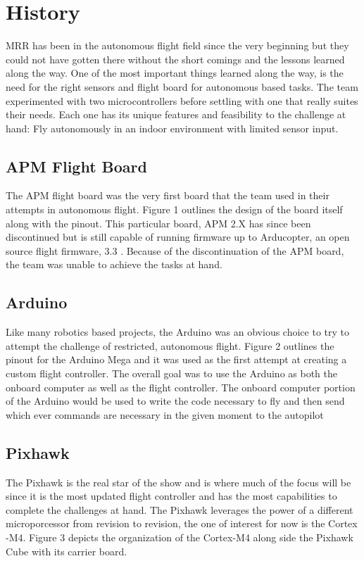 \documentclass[conference,12pt, ]{IEEEtran}
\begin{document}
\section{History}
MRR has been in the autonomous flight field since the very beginning but they could not have gotten there without the short comings and the lessons learned along the way. One of the most important things learned along the way, is the need for the right sensors and flight board for autonomous based tasks. The team experimented with two microcontrollers before settling with one that really suites their needs. Each one has its unique features and feasibility to the challenge at hand: Fly autonomously in an indoor environment with limited sensor input.

\subsection{APM Flight Board}
The APM flight board was the very first board that the team used in their attempts in autonomous flight. Figure 1 outlines the design of the board itself along with the pinout. This particular board, APM 2.X has since been discontinued but is still capable of running firmware up to Arducopter, an open source flight firmware, 3.3 \cite{apm_board}. Because of the discontinuation of the APM board, the team was unable to achieve the tasks at hand. 

\subsection{Arduino}
Like many robotics based projects, the Arduino was an obvious choice to try to attempt the challenge of restricted, autonomous flight. Figure 2 outlines the pinout for the Arduino Mega and it was used as the first attempt at creating a custom flight controller. The overall goal was to use the Arduino as both the onboard computer as well as the flight controller. The onboard computer portion of the Arduino would be used to write the code necessary to fly and then send which ever commands are necessary in the given moment to the autopilot \cite{on_board}

\subsection{Pixhawk}
The Pixhawk is the real star of the show and is where much of the focus will be since it is the most updated flight controller and has the most capabilities to complete the challenges at hand. The Pixhawk leverages the power of a different microporcessor from revision to revision, the one of interest for now is the Cortex -M4. Figure 3 depicts the organization of the Cortex-M4 along side the Pixhawk Cube with its carrier board.
\end{document}
